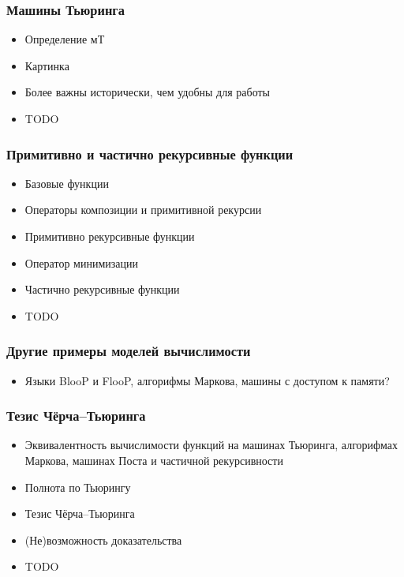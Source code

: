\documentclass[10pt]{beamer}
\begin{document}
\begin{frame}
    \frametitle{Машины Тьюринга}
    \begin{itemize}
        \item Определение мТ
        \item Картинка
        \item Более важны исторически, чем удобны для работы
        \item TODO
    \end{itemize}
\end{frame}

\begin{frame}
    \frametitle{Примитивно и частично рекурсивные функции}
    \begin{itemize}
        \item Базовые функции
        \item Операторы композиции и примитивной рекурсии
        \item Примитивно рекурсивные функции
        \item Оператор минимизации
        \item Частично рекурсивные функции
        \item TODO
    \end{itemize}
\end{frame}

\begin{frame}
    \frametitle{Другие примеры моделей вычислимости}
    \begin{itemize}
        \item Языки BlooP и FlooP, алгорифмы Маркова, машины с доступом к памяти?
    \end{itemize}
\end{frame}

\begin{frame}
    \frametitle{Тезис Чёрча--Тьюринга}
    \begin{itemize}
        \item Эквивалентность вычислимости функций на машинах Тьюринга, алгорифмах Маркова, машинах Поста и частичной рекурсивности
        \item Полнота по Тьюрингу
        \item Тезис Чёрча--Тьюринга
        \item (Не)возможность доказательства
        \item TODO
    \end{itemize}
\end{frame}
\end{document}
